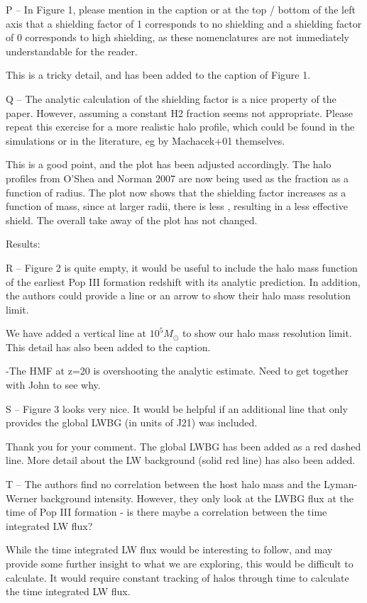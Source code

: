\documentclass[11pt]{article}
\newenvironment{referee}[1][]{%
    \ignorespaces%
    \begin{mdframed}[style=myquotestyle,#1]%
}{%
    \end{mdframed}%
    \ignorespacesafterend%
}%
\begin{document}
\begin{referee}
P -- In Figure 1, please mention in the caption or at the top / bottom of the left axis that a shielding factor of 1 corresponds to no shielding and a shielding factor of 0 corresponds to high shielding, as these nomenclatures are not immediately understandable for the reader.
\end{referee}
This is a tricky detail, and has been added to the caption of Figure 1.

\begin{referee}
Q -- The analytic calculation of the shielding factor is a nice property of the paper. However, assuming a constant H2 fraction seems not appropriate. Please repeat this exercise for a more realistic halo profile, which could be found in the simulations or in the literature, eg by Machacek+01 themselves.
\end{referee}
This is a good point, and the plot has been adjusted accordingly. The halo profiles from O'Shea and Norman 2007 are now being used as the \hh{} fraction as a function of radius. The plot now shows that the shielding factor increases as a function of mass, since at larger radii, there is less \hh{}, resulting in a less effective \hh{} shield. The overall take away of the plot has not changed. 

\begin{referee}
Results:

R -- Figure 2 is quite empty, it would be useful to include the halo mass function of the earliest Pop III formation redshift with its analytic prediction. In addition, the authors could provide a line or an arrow to show their halo mass resolution limit.
\end{referee}
We have added a vertical line at $10^5 M_{\odot}$ to show our halo mass resolution limit. This detail has also been added to the caption.

-The HMF at z=20 is overshooting the analytic estimate. Need to get together with John to see why. 

\begin{referee}
S -- Figure 3 looks very nice. It would be helpful if an additional line that only 
provides the global LWBG (in units of J21) was included.
\end{referee}
Thank you for your comment. The global LWBG has been added as a red dashed line. More detail about the LW background (solid red line) has also been added.

\begin{referee}
T -- The authors find no correlation between the host halo mass and the Lyman-Werner background intensity. However, they only look at the LWBG flux at the time of Pop III formation - is there maybe a correlation between the time integrated LW flux?
\end{referee}
While the time integrated LW flux would be interesting to follow, and may provide some further insight to what we are exploring, this would be difficult to calculate. It would require constant tracking of halos through time to calculate the time integrated LW flux. 
\end{document}
